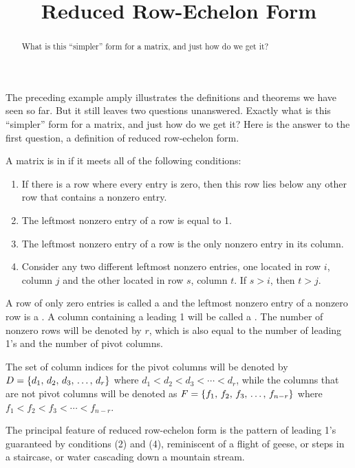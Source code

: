 \documentclass{ximera}
\title{Reduced Row-Echelon Form}
\begin{document}
\begin{abstract}
  What is this ``simpler'' form for a matrix, and just how do we get it?
\end{abstract}
\maketitle

The preceding example amply illustrates the definitions and theorems
we have seen so far.  But it still leaves two questions unanswered.
Exactly what is this ``simpler'' form for a matrix, and just how do we
get it?  Here is the answer to the first question, a definition of
reduced row-echelon form.

\begin{definition}
A matrix is in  if it meets all of the following conditions:
\begin{enumerate}
\item If there is a row where every entry is zero, then this row lies below any other row that contains a nonzero entry.
\item The leftmost nonzero entry of a row is equal to 1.
\item The leftmost nonzero entry of a row is the only nonzero entry in its column.
\item Consider any two different leftmost nonzero entries, one located in row $i$, column $j$ and the other located in row $s$, column $t$.  If $s>i$, then $t>j$.
\end{enumerate}
A row of only zero entries is called a  and the leftmost nonzero entry of a nonzero row is a .  A column containing a leading 1 will be called a .  The number of nonzero rows will be denoted by $r$, which is also equal to the number of leading 1's and the number of pivot columns.
\end{definition}

The set of column indices for the pivot columns will be denoted by $D=\left\{d_1,\,d_2,\,d_3,\,\ldots,\,d_r\right\}$ where
$d_1<d_2<d_3<\cdots<d_r$,
while the columns that are not pivot columns will be denoted as $F=\left\{f_1,\,f_2,\,f_3,\,\ldots,\,f_{n-r}\right\}$ where
$f_1<f_2<f_3<\cdots<f_{n-r}$.

The principal feature of reduced row-echelon form is the pattern of
leading 1's guaranteed by conditions (2) and (4), reminiscent of a
flight of geese, or steps in a staircase, or water cascading down a
mountain stream.
\end{document}
